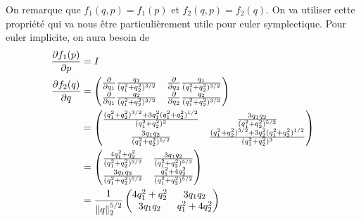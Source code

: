 On remarque que $f_1(q,p) = f_1(p)$ et $f_2(q,p) = f_2(q)$.
On va utiliser cette propriété qui va nous être particulièrement utile pour euler symplectique.
Pour euler implicite, on aura besoin de
\begin{align*}
  \frac{\partial f_1(p)}{\partial p} & = I\\
  \frac{\partial f_2(q)}{\partial q} & =
  \begin{pmatrix}
    \frac{\partial }{\partial q_1}\frac{q_1}{(q_1^2 + q_2^2)^{3/2}} &
    \frac{\partial }{\partial q_2}\frac{q_1}{(q_1^2 + q_2^2)^{3/2}}\\
    \frac{\partial }{\partial q_1}\frac{q_2}{(q_1^2 + q_2^2)^{3/2}} &
    \frac{\partial }{\partial q_2}\frac{q_2}{(q_1^2 + q_2^2)^{3/2}}
  \end{pmatrix}\\
  & =
  \begin{pmatrix}
    \frac{(q_1^2 + q_2^2)^{3/2} + 3q_1^2(q_1^2 + q_2^2)^{1/2}}{(q_1^2 + q_2^2)^3} &
    \frac{3q_1q_2}{(q_1^2 + q_2^2)^{5/2}}\\
    \frac{3q_1q_2}{(q_1^2 + q_2^2)^{5/2}} &
    \frac{(q_1^2 + q_2^2)^{3/2} + 3q_2^2(q_1^2 + q_2^2)^{1/2}}{(q_1^2 + q_2^2)^3}
  \end{pmatrix}\\
  & =
  \begin{pmatrix}
    \frac{4q_1^2 + q_2^2}{(q_1^2 + q_2^2)^{5/2}} &
    \frac{3q_1q_2}{(q_1^2 + q_2^2)^{5/2}}\\
    \frac{3q_1q_2}{(q_1^2 + q_2^2)^{5/2}} &
    \frac{q_1^2 + 4q_2^2}{(q_1^2 + q_2^2)^{5/2}}
  \end{pmatrix}\\
  & =
  \frac{1}{\|q\|_2^{5/2}}
  \begin{pmatrix}
    4q_1^2 + q_2^2 &
    3q_1q_2\\
    3q_1q_2 &
    q_1^2 + 4q_2^2
  \end{pmatrix}
\end{align*}
